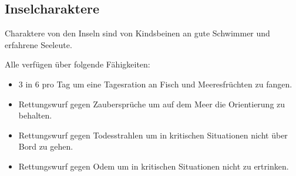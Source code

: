\documentclass[11pt]{wbzine}
\begin{document}
\begin{multicols}{2}

\subsection{Inselcharaktere}

Charaktere von den Inseln sind von Kindsbeinen an gute Schwimmer
und erfahrene Seeleute.

Alle verfügen über folgende Fähigkeiten:

\begin{itemize}
    \item 3 in 6 pro Tag um eine Tagesration an Fisch und Meeresfrüchten zu
fangen.

\item Rettungswurf gegen Zaubersprüche um auf dem Meer die Orientierung
zu behalten.

\item Rettungswurf gegen Todesstrahlen um in kritischen Situationen
nicht über Bord zu gehen.

\item Rettungswurf gegen Odem um in kritischen Situationen nicht zu
ertrinken.
\end{itemize}


\end{multicols}
\end{document}
